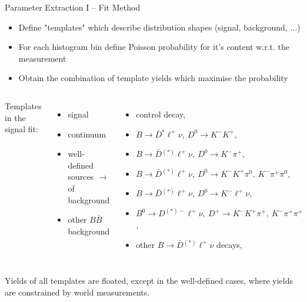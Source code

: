 \documentclass[serif]{beamer}
\begin{document}
\begin{frame}[t]{Parameter Extraction I -- Fit Method}
\vspace{-5mm}
\small

\begin{block}{}
	\begin{itemize}
		\item Define "templates" which describe distribution shapes (signal, background, $\dots$)
		\item For each histogram bin define Poisson probability for it's content w.r.t. the measurement
		\item Obtain the combination of template yields which maximise the probability
	\end{itemize}
\end{block}

\begin{columns}
	Templates in the signal fit:
	\begin{itemize}
		\item signal
		\item continuum
		\item well-defined sources $\to$\\of background
		\item other $B \bar B$ background
	\end{itemize}
	\begin{itemize}
		\tiny
		\item control decay,
		\item $B \to \bar{D} {}^* \ell^+ \nu,~D^0 \to K^-K^+$,
		\item $B \to \bar{D} {}^{(*)} \ell^+ \nu,~D^0 \to K^-\pi^+$,
		\item $B \to \bar{D} {}^{(*)} \ell^+ \nu,~D^0 \to K^-K^+\pi^0,~K^-\pi^+\pi^0$,
		\item $B \to \bar{D} {}^{(*)} \ell^+ \nu,~D^0 \to K^-\ell^+\nu$,
		\item $B^0 \to D^{(*)-} \ell^+ \nu,~D^+ \to K^-K^+\pi^+,~K^-\pi^+\pi^+$,
		\item other $B \to \bar D {}^{(*)} \ell^+ \nu$ decays,
	\end{itemize}
\end{columns}

\vspace{2mm}
{\color{red}Yields of all templates are floated, except in the well-defined cases, where yields are constrained by world measurements.}

\end{frame}
\end{document}
